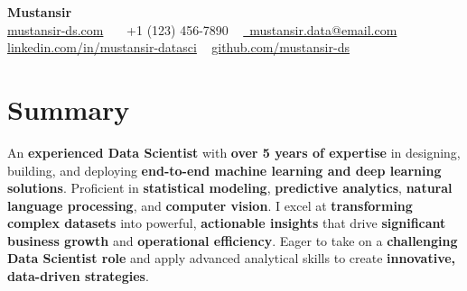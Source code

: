 \documentclass[10pt]{article} %
\begin{document}
\begin{center}
    {\Huge \textbf{Mustansir}} \\ %
    \vspace{2pt}
    \small
    \href{https://mustansir-ds.com}{mustansir-ds.com} \textbar \ \
    \Mobilefone~+1 (123) 456-7890 \textbar \ %
    \href{mailto:mustansir.data@email.com}{\Email~mustansir.data@email.com} \textbar \ %
    \href{https://linkedin.com/in/mustansir-datasci}{linkedin.com/in/mustansir-datasci} \textbar \ %
    \href{https://github.com/mustansir-ds}{github.com/mustansir-ds} %
\end{center}

\vspace{-10pt} %


\section*{Summary}
\begin{justify}
An \textbf{experienced Data Scientist} with \textbf{over 5 years of expertise} in designing, building, and deploying \textbf{end-to-end machine learning and deep learning solutions}. Proficient in \textbf{statistical modeling}, \textbf{predictive analytics}, \textbf{natural language processing}, and \textbf{computer vision}. I excel at \textbf{transforming complex datasets} into powerful, \textbf{actionable insights} that drive \textbf{significant business growth} and \textbf{operational efficiency}. Eager to take on a \textbf{challenging Data Scientist role} and apply advanced analytical skills to create \textbf{innovative, data-driven strategies}.
\end{justify}

\end{document}
